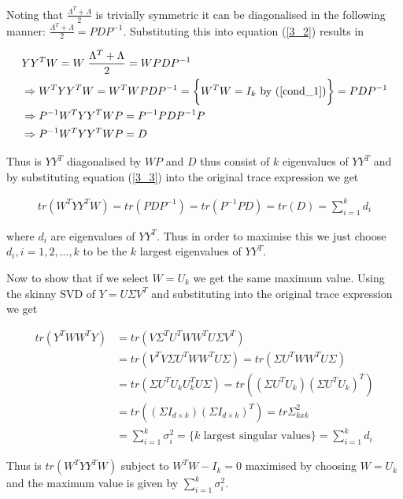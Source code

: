 Noting that $\frac{\Lambda^T + \Lambda}{2}$ is trivially symmetric it can be diagonalised in the following manner: $\frac{\Lambda^T + \Lambda}{2} = PDP^{-1}$. Substituting this into equation (\ref{3_2}) results in

\begin{align}
  & Y Y^T W = W \; \frac{\Lambda^T + \Lambda}{2} = W PDP^{-1} \\
  & \Rightarrow  W^T Y Y^T W = W^T W PDP^{-1} = \bigg\{ W^T W = I_k \text{ by } (\ref{cond_1})\bigg\} = PDP^{-1} \\
  \label{3_3}
  & \Rightarrow P^{-1} W^T Y Y^T W P = P^{-1} PDP^{-1} P \\
  & \Rightarrow P^{-1}W^T Y Y^T WP = D
\end{align}

Thus is $Y Y^T$ diagonalised by $WP$ and $D$ thus consist of $k$ eigenvalues of $Y Y^T$ and by substituting equation (\ref{3_3}) into the original trace expression we get

\begin{align}
  tr(W^T Y Y^T W) = tr(PDP^{-1}) = tr(P^{-1} P D) = tr(D) = \sum_{i=1}^k d_i
\end{align}

where $d_i$ are eigenvalues of $Y Y^T$. Thus in order to maximise this we just choose $d_i, i = 1,2,...,k$ to be the $k$ largest eigenvalues of $Y Y^T$.

Now to show that if we select $W = U_k$ we get the same maximum value. Using the skinny SVD of $Y = U \Sigma V^T$ and substituting into the original trace expression we get

\begin{align}
  tr(Y^T W W^T Y) & = tr(V \Sigma^T U^T W W^T U \Sigma V^T) \\
  & = tr(V^TV \Sigma U^T W W^T U \Sigma) = tr(\Sigma U^T W W^T U \Sigma) \\
  & = tr(\Sigma U^T U_k U_k^T U \Sigma) = tr((\Sigma U^T U_k) (\Sigma U^T U_k)^T) \\
  & = tr((\Sigma I_{d \times k}) (\Sigma I_{d \times k})^T) = tr{\Sigma_{kxk}^2} \\
  & = \sum_{i=1}^k \sigma_i^2 = \bigg\{k \text{ largest singular values} \bigg\} = \sum_{i=1}^k d_i
\end{align}


Thus is $tr(W^T Y Y^T W)$ subject to $W^T W - I_k = 0$ maximised by choosing $W = U_k$ and the maximum value is given by $\sum_{i=1}^k \sigma_i^2$.

